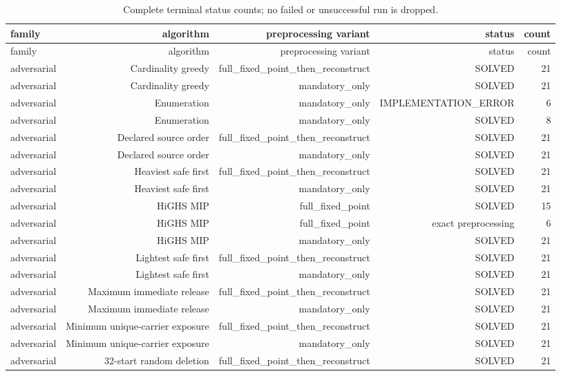 {\footnotesize
\begin{longtable}{lrrrr}
\caption{Complete terminal status counts; no failed or unsuccessful run is dropped.}\label{tab:aor-failure-statuses}\\
\toprule
family & algorithm & preprocessing variant & status & count \\
\midrule
\endfirsthead
\toprule
family & algorithm & preprocessing variant & status & count \\
\midrule
\endhead
adversarial & Cardinality greedy & full\_fixed\_point\_then\_reconstruct & SOLVED & 21 \\
adversarial & Cardinality greedy & mandatory\_only & SOLVED & 21 \\
adversarial & Enumeration & mandatory\_only & IMPLEMENTATION\_ERROR & 6 \\
adversarial & Enumeration & mandatory\_only & SOLVED & 8 \\
adversarial & Declared source order & full\_fixed\_point\_then\_reconstruct & SOLVED & 21 \\
adversarial & Declared source order & mandatory\_only & SOLVED & 21 \\
adversarial & Heaviest safe first & full\_fixed\_point\_then\_reconstruct & SOLVED & 21 \\
adversarial & Heaviest safe first & mandatory\_only & SOLVED & 21 \\
adversarial & HiGHS MIP & full\_fixed\_point & SOLVED & 15 \\
adversarial & HiGHS MIP & full\_fixed\_point & exact preprocessing & 6 \\
adversarial & HiGHS MIP & mandatory\_only & SOLVED & 21 \\
adversarial & Lightest safe first & full\_fixed\_point\_then\_reconstruct & SOLVED & 21 \\
adversarial & Lightest safe first & mandatory\_only & SOLVED & 21 \\
adversarial & Maximum immediate release & full\_fixed\_point\_then\_reconstruct & SOLVED & 21 \\
adversarial & Maximum immediate release & mandatory\_only & SOLVED & 21 \\
adversarial & Minimum unique-carrier exposure & full\_fixed\_point\_then\_reconstruct & SOLVED & 21 \\
adversarial & Minimum unique-carrier exposure & mandatory\_only & SOLVED & 21 \\
adversarial & 32-start random deletion & full\_fixed\_point\_then\_reconstruct & SOLVED & 21 \\

\end{longtable}}
